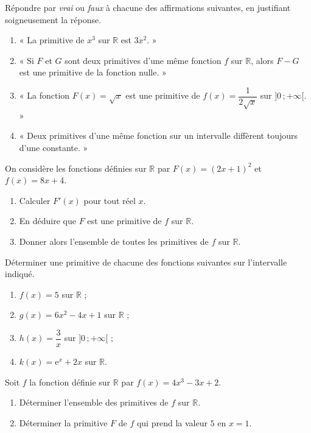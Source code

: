 \documentclass[11pt]{article}
\newcounter{popsec}
\newcounter{popsub}
\newcommand{\courssub}[1]{%
  \stepcounter{popsub}%
  \par\vspace{9pt}\noindent{\popxbold\fontsize{11.5}{13}\selectfont\color{popink}{\color{poporange}\thepopsec.\thepopsub}\hspace{6pt}#1}\par\nopagebreak\vspace{4pt}
}
\begin{document}
\begin{exercice}
Répondre par \emph{vrai} ou \emph{faux} à chacune des affirmations suivantes, en justifiant soigneusement la réponse.
\begin{enumerate}
\item « La primitive de $x^3$ sur $\mathbb{R}$ est $3x^2$. »
\item « Si $F$ et $G$ sont deux primitives d'une même fonction $f$ sur $\mathbb{R}$, alors $F - G$ est une primitive de la fonction nulle. »
\item « La fonction $F(x) = \sqrt{x}$ est une primitive de $f(x) = \dfrac{1}{2\sqrt{x}}$ sur $]0\,;+\infty[$. »
\item « Deux primitives d'une même fonction sur un intervalle diffèrent toujours d'une constante. »
\end{enumerate}
\end{exercice}

\begin{exercice}
On considère les fonctions définies sur $\mathbb{R}$ par $F(x) = (2x+1)^2$ et $f(x) = 8x + 4$.
\begin{enumerate}
\item Calculer $F'(x)$ pour tout réel $x$.
\item En déduire que $F$ est une primitive de $f$ sur $\mathbb{R}$.
\item Donner alors l'ensemble de toutes les primitives de $f$ sur $\mathbb{R}$.
\end{enumerate}
\end{exercice}

\begin{exercice}
Déterminer une primitive de chacune des fonctions suivantes sur l'intervalle indiqué.
\begin{enumerate}
\item $f(x) = 5$ sur $\mathbb{R}$ ;
\item $g(x) = 6x^2 - 4x + 1$ sur $\mathbb{R}$ ;
\item $h(x) = \dfrac{3}{x}$ sur $]0\,;+\infty[$ ;
\item $k(x) = \mathrm{e}^{x} + 2x$ sur $\mathbb{R}$.
\end{enumerate}
\end{exercice}

\courssub{Je m'entraîne}

\begin{exercice}
Soit $f$ la fonction définie sur $\mathbb{R}$ par $f(x) = 4x^3 - 3x + 2$.
\begin{enumerate}
\item Déterminer l'ensemble des primitives de $f$ sur $\mathbb{R}$.
\item Déterminer la primitive $F$ de $f$ qui prend la valeur $5$ en $x = 1$.
\end{enumerate}
\end{exercice}
\end{document}

